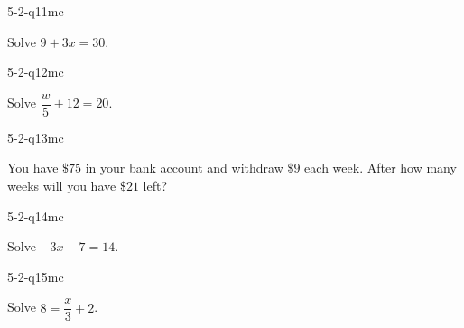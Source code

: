 \begin{practiceQuestion}{5-2-q11}{mc}
\begin{questionText}
Solve $9 + 3x = 30$.
\end{questionText}
\end{practiceQuestion}

\begin{practiceQuestion}{5-2-q12}{mc}
\begin{questionText}
Solve $\dfrac{w}{5} + 12 = 20$.
\end{questionText}
\end{practiceQuestion}

\begin{practiceQuestion}{5-2-q13}{mc}
\begin{questionText}
You have $\$75$ in your bank account and withdraw $\$9$ each week. After how many weeks will you have $\$21$ left?
\end{questionText}
\end{practiceQuestion}

\begin{practiceQuestion}{5-2-q14}{mc}
\begin{questionText}
Solve $-3x - 7 = 14$.
\end{questionText}
\end{practiceQuestion}

\begin{practiceQuestion}{5-2-q15}{mc}
\begin{questionText}
Solve $8 = \dfrac{x}{3} + 2$.
\end{questionText}
\end{practiceQuestion}

